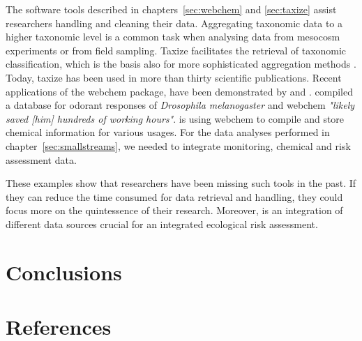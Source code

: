 The software tools described in chapters~\ref{sec:webchem} and \ref{sec:taxize} assist researchers handling and cleaning their data. 
Aggregating taxonomic data to a higher taxonomic level is a common task when analysing data from mesocosm experiments or from field sampling.
Taxize facilitates the retrieval of taxonomic classification, which is the basis also for more sophisticated aggregation methods \citep{cuffney_ambiguous_2007}. 
Today, taxize has been used in more than thirty scientific publications.
Recent applications of the webchem package, have been demonstrated by \citet{munch_door_2016} and \citet{ranke_jranke/chents_2016}. 
\citet{munch_door_2016} compiled a database for odorant responses of \textit{Drosophila melanogaster} and webchem \emph{"likely saved [him] hundreds of working hours"}. 
\citet{ranke_jranke/chents_2016} is using webchem to compile and store chemical information for various usages. 
For the data analyses performed in chapter~\ref{sec:smallstreams}, we needed to integrate monitoring, chemical and risk assessment data.

These examples show that researchers have been missing such tools in the past.
If they can reduce the time consumed for data retrieval and handling, they could focus more on the quintessence of their research. 
Moreover, is an integration of different data sources crucial for an integrated ecological risk assessment.


\clearpage
\section{Conclusions}








\clearpage
\section{References}
\printbibliography[heading=none]

